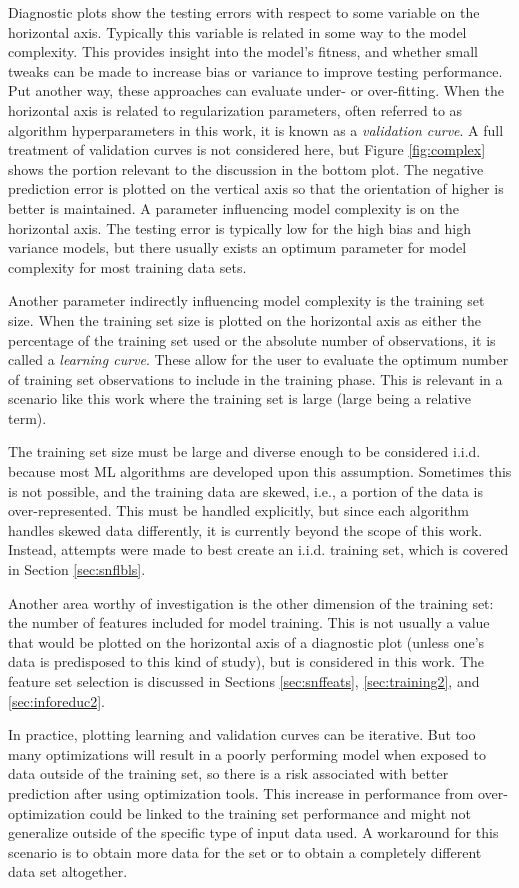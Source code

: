 Diagnostic plots show the testing errors with respect to some variable on the
horizontal axis.  Typically this variable is related in some way to the model
complexity. This provides insight into the model's fitness, and whether small
tweaks can be made to increase bias or variance to improve testing performance.
Put another way, these approaches can evaluate under- or over-fitting.  When
the horizontal axis is related to regularization parameters, often referred to
as algorithm hyperparameters in this work, it is known as a \textit{validation
curve}. A full treatment of validation curves is not considered here, but
Figure \ref{fig:complex} shows the portion relevant to the discussion in the
bottom plot.  The negative prediction error is plotted on the vertical axis
so that the orientation of higher is better is maintained.  A parameter
influencing model complexity is on the horizontal axis.  The testing error is
typically low for the high bias and high variance models, but there usually
exists an optimum parameter for model complexity for most training data sets. 

Another parameter indirectly influencing model complexity is the training set
size.  When the training set size is plotted on the horizontal axis as either
the percentage of the training set used or the absolute number of observations,
it is called a \textit{learning curve}.  These allow for the user to evaluate
the optimum number of training set observations to include in the training
phase.  This is relevant in a scenario like this work where the training set is
large (large being a relative term).  

The training set size must be large and diverse enough to be considered
\gls{i.i.d.} because most \gls{ML} algorithms are developed upon this
assumption. Sometimes this is not possible, and the training data are skewed,
i.e., a portion of the data is over-represented. This must be handled
explicitly, but since each algorithm handles skewed data differently, it is
currently beyond the scope of this work. Instead, attempts were made to best
create an \gls{i.i.d.} training set, which is covered in Section
\ref{sec:snflbls}.

Another area worthy of investigation is the other dimension of the training
set: the number of features included for model training. This is not usually a
value that would be plotted on the horizontal axis of a diagnostic plot (unless
one's data is predisposed to this kind of study), but is considered in this
work. The feature set selection is discussed in Sections \ref{sec:snffeats},
\ref{sec:training2}, and \ref{sec:inforeduc2}.

In practice, plotting learning and validation curves can be iterative. But too
many optimizations will result in a poorly performing model when exposed to
data outside of the training set, so there is a risk associated with better
prediction after using optimization tools.  This increase in performance from
over-optimization could be linked to the training set performance and might not
generalize outside of the specific type of input data used.  A workaround for
this scenario is to obtain more data for the set or to obtain a completely
different data set altogether. 

